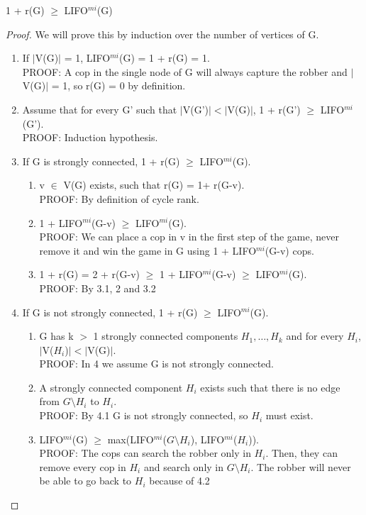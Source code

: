 \begin{lemma}
1 + r(G) $\geq$ LIFO$^{mi}$(G)
\end{lemma}
\begin{proof}
We will prove this by induction over the number of vertices of G.
\begin{enumerate}
  \item If $|$V(G)$|$ = 1, LIFO$^{mi}$(G) = 1 + r(G) = 1. \\
  PROOF: A cop in the single node of G will always capture the robber and $|$V(G)$|$ = 1, so r(G) = 0 by definition.
  \item Assume that for every G' such that  $|$V(G')$| < |$V(G)$|$, 1 + r(G') $\geq$ LIFO$^{mi}$(G'). \\
  PROOF: Induction hypothesis.
  \item If G is strongly connected, 1 + r(G) $\geq$ LIFO$^{mi}$(G).
  \begin{enumerate}[label*=\arabic*.]
    \item v $\in$ V(G) exists, such that r(G) = 1+ r(G-v). \\
    PROOF: By definition of cycle rank.
    \item 1 + LIFO$^{mi}$(G-v) $\geq$ LIFO$^{mi}$(G). \\
    PROOF: We can place a cop in v in the first step of the game, never remove it and win the game in G using 1 + LIFO$^{mi}$(G-v) cops.
    \item  1 + r(G) = 2 + r(G-v) $\geq$ 1 + LIFO$^{mi}$(G-v) $\geq$ LIFO$^{mi}$(G). \\
    PROOF: By 3.1, 2 and 3.2
  \end{enumerate}
  \item If G is not strongly connected, 1 + r(G) $\geq$ LIFO$^{mi}$(G).
  \begin{enumerate}[label*=\arabic*.]
    \item G has k $>$ 1 strongly connected components $H_1, \ldots, H_k$ and for every $H_i$, $|$V($H_i$)$| < |$V(G)$|$. \\
    PROOF: In 4 we assume G is not strongly connected.
    \item A strongly connected component $H_i$ exists such that there is no edge from $G\setminus H_i$ to $H_i$. \\
    PROOF: By 4.1 G is not strongly connected, so $H_i$ must exist.
    \item LIFO$^{mi}$(G) $\geq$ max(LIFO$^{mi}$($G\setminus H_i$), LIFO$^{mi}$($H_i$)). \\
    PROOF: The cops can search the robber only in $H_i$. Then, they can remove every cop in $H_i$ and search only in $G\setminus H_i$. The robber will never be able to go back to $H_i$ because of 4.2

\end{enumerate}
\end{enumerate}
\end{proof}
